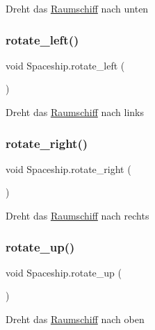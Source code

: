 Dreht das \hyperlink{class_raumschiff}{Raumschiff} nach unten \mbox{\label{class_spaceship_a0b021ca84c90939591bb5068542c1dde}} 
\subsubsection{\texorpdfstring{rotate\+\_\+left()}{rotate\_left()}}
{\footnotesize\ttfamily void Spaceship.\+rotate\+\_\+left (\begin{DoxyParamCaption}{ }\end{DoxyParamCaption})}



Dreht das \hyperlink{class_raumschiff}{Raumschiff} nach links 

\mbox{\label{class_spaceship_adaa371fa37ba5b564b15a35b3ff94437}} 
\subsubsection{\texorpdfstring{rotate\+\_\+right()}{rotate\_right()}}
{\footnotesize\ttfamily void Spaceship.\+rotate\+\_\+right (\begin{DoxyParamCaption}{ }\end{DoxyParamCaption})}



Dreht das \hyperlink{class_raumschiff}{Raumschiff} nach rechts 

\mbox{\label{class_spaceship_a311d6c40b0c54f11a2da4624a5e2487c}} 
\subsubsection{\texorpdfstring{rotate\+\_\+up()}{rotate\_up()}}
{\footnotesize\ttfamily void Spaceship.\+rotate\+\_\+up (\begin{DoxyParamCaption}{ }\end{DoxyParamCaption})}



Dreht das \hyperlink{class_raumschiff}{Raumschiff} nach oben 

